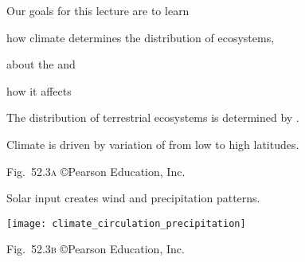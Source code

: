 \documentclass[t,handout]{beamer}  %
\begin{document}

\begin{frame}{Our goals for this lecture are to learn}

	\hangpara how climate determines the distribution of ecosystems,
	
	\hangpara about the  and
	
	\hangpara how it affects  
	
\end{frame}
%
{
	\begin{frame}[b]{The distribution of terrestrial ecosystems is determined by .}
		
	\end{frame}
}
%


{
	\begin{frame}[b]{Climate is driven by variation of  from low to high latitudes.}
		
		\hfill \tiny Fig.~52.3\textsc{a} \copyright Pearson Education, Inc.
	\end{frame}
}
%
{
	\begin{frame}[t]{Solar input creates wind and precipitation patterns.}
		
		\texttt{[image: climate\_circulation\_precipitation]}
		
		\vfilll
		
		\hfill \tiny Fig.~52.3\textsc{b} \copyright Pearson Education, Inc.
	\end{frame}
}
%
\end{document}
